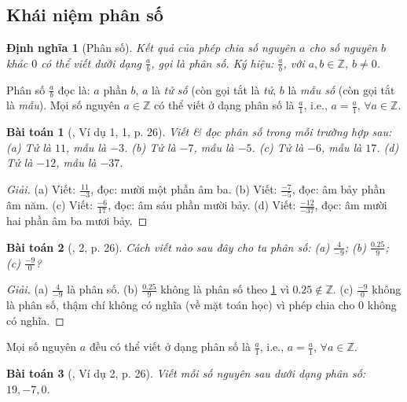 \documentclass{article}
\newtheorem{baitoan}{Bài toán}
\newtheorem{dinhnghia}{Định nghĩa}
\begin{document}
\subsection{Khái niệm phân số}

\begin{dinhnghia}[Phân số]
	\label{def: fraction}
	Kết quả của phép chia số nguyên $a$ cho số nguyên $b$ khác $0$ có thể viết dưới dạng $\frac{a}{b}$, gọi là \emph{phân số}. Ký hiệu: $\frac{a}{b}$, với $a,b\in\mathbb{Z}$, $b\ne0$.
\end{dinhnghia}
Phân số $\frac{a}{b}$ đọc là: $a$ phần $b$, $a$ là \textit{tử số} (còn gọi tắt là \textit{tử}, $b$ là \textit{mẫu số} (còn gọi tắt là \textit{mẫu}). Mọi số nguyên $a\in\mathbb{Z}$ có thể viết ở dạng phân số là $\frac{a}{1}$, i.e., $a = \frac{a}{1}$, $\forall a\in\mathbb{Z}$.

\begin{baitoan}[\cite{SGK_Toan_6_Canh_Dieu_tap_2}, Ví dụ 1, 1, p. 26]
	Viết \& đọc phân số trong mỗi trường hợp sau: (a) Tử là $11$, mẫu là $-3$. (b) Tử là $-7$, mẫu là $-5$. (c) Tử là $-6$, mẫu là $17$. (d) Tử là $-12$, mẫu là $-37$.
\end{baitoan}

\begin{proof}[Giải]
	(a) Viết: $\frac{11}{-3}$, đọc: mười một phần âm ba. (b) Viết: $\frac{-7}{-5}$, đọc: âm bảy phần âm năm. (c) Viết: $\frac{-6}{17}$, đọc: âm sáu phần mười bảy. (d) Viết: $\frac{-12}{-37}$, đọc: âm mười hai phần âm ba mươi bảy.
\end{proof}

\begin{baitoan}[\cite{SGK_Toan_6_Canh_Dieu_tap_2}, 2, p. 26]
	Cách viết nào sau đây cho ta phân số: (a) $\frac{4}{-9}$; (b) $\frac{0.25}{9}$; (c) $\frac{-9}{0}$?
\end{baitoan}

\begin{proof}[Giải]
	(a) $\frac{4}{-9}$ là phân số. (b) $\frac{0.25}{9}$ không là phân số theo \ref{def: fraction} vì $0.25\notin\mathbb{Z}$. (c) $\frac{-9}{0}$ không là phân số, thậm chí không có nghĩa (về mặt toán học) vì phép chia cho $0$ không có nghĩa.
\end{proof}
Mọi số nguyên $a$ đều có thể viết ở dạng phân số là $\frac{a}{1}$, i.e., $a = \frac{a}{1}$, $\forall a\in\mathbb{Z}$.

\begin{baitoan}[\cite{SGK_Toan_6_Canh_Dieu_tap_2}, Ví dụ 2, p. 26]
	Viết mỗi số nguyên sau dưới dạng phân số: $19,-7,0$.
\end{baitoan}
\end{document}
